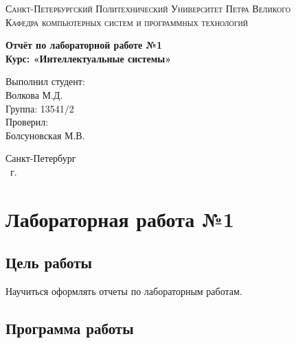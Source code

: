 \documentclass[14pt,a4paper,report]{report}
\begin{document}
\def\contentsname{Содержание}

\begin{titlepage}
	\begin{center}
		\textsc{Санкт-Петербургский Политехнический 
			Университет Петра Великого\\[5mm]
			Кафедра компьютерных систем и программных технологий}
		
		\vfill
		
		\textbf{Отчёт по лабораторной работе №1\\[3mm]
			Курс: «Интеллектуальные системы»\\[41mm]
		}
	\end{center}
	
	\hfill
	\begin{minipage}{.4\textwidth}
		Выполнил студент:\\[2mm] 
		Волкова М.Д.\\
		Группа: 13541/2\\[5mm]
		
		Проверил:\\[2mm] 
		Болсуновская М.В.
	\end{minipage}
	\vfill
	\begin{center}
		Санкт-Петербург\\ \the\year\ г.
	\end{center}
\end{titlepage}

\tableofcontents
\clearpage

\chapter{Лабораторная работа №1}

\section{Цель работы}

Научиться оформлять отчеты по лабораторным работам.

\section{Программа работы}
\end{document}
